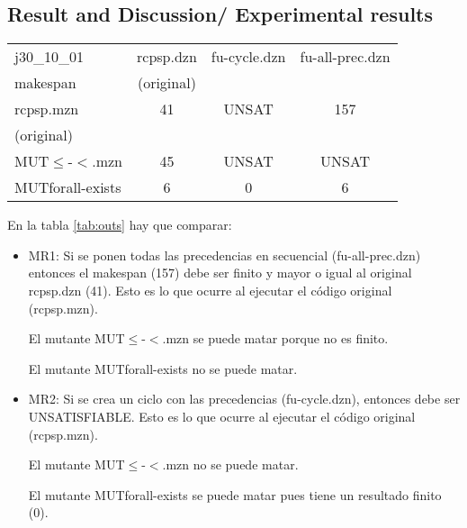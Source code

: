 \newpage
\subsection{Result and Discussion/ Experimental results}

\begin{table*}[htb]
    \centering
    \begin{tabular}{l|c|c|c}

    j30\_10\_01  &  rcpsp.dzn  & fu-cycle.dzn & fu-all-prec.dzn\\
    makespan  & (original) &  & \\
    \hline
     rcpsp.mzn    & 41 & UNSAT & 157 \\
     (original)   &  &  & \\
     \hline
    
    MUT$\leq$-$<$.mzn & 45 & UNSAT & UNSAT \\
     \hline
    
    MUTforall-exists  & 6 & 0& 6 \\
     \hline
    \end{tabular}
    \caption{rows: codes (mutations); columns: data (follow-ups). UNSAT is the sort-name of UNSATISFIABLE }
    \label{tab:outs}
\end{table*}

En la tabla \ref{tab:outs} hay que comparar:
\begin{itemize}
    \item MR1: Si se ponen todas las precedencias en secuencial (fu-all-prec.dzn) entonces el makespan (157) debe ser finito y mayor o igual al original rcpsp.dzn (41). Esto es lo que ocurre al ejecutar el código original (rcpsp.mzn).

    El mutante MUT$\leq$-$<$.mzn se puede matar porque no es finito.

    El mutante MUTforall-exists no se puede matar.

    \item MR2: Si se crea un ciclo con las precedencias (fu-cycle.dzn), entonces debe ser UNSATISFIABLE. Esto es lo que ocurre al ejecutar el código original (rcpsp.mzn).

    El mutante MUT$\leq$-$<$.mzn no se puede matar.

    El mutante MUTforall-exists se puede matar pues tiene un resultado finito (0).

\end{itemize}

\newpage
\newpage